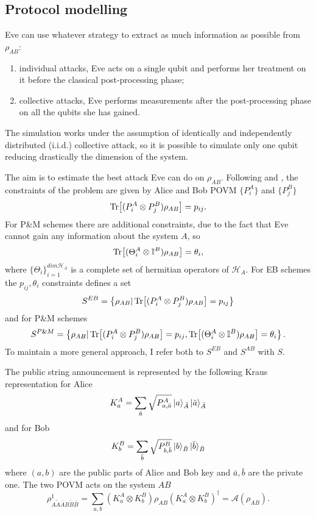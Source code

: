 \documentclass{article}
\begin{document}
    \subsection{Protocol modelling}
    Eve can use whatever strategy to extract as much information as possible from \(\rho_{AB}\):
    \begin{enumerate}
        \item individual attacks, Eve acts on a single qubit and performs her treatment on it before the classical post-processing phase;
        \item collective attacks, Eve performs measurements after the post-processing phase on all the qubits she has gained.
    \end{enumerate}
    The simulation works under the assumption of identically and independently distributed (i.i.d.) collective attack, so it is possible to simulate only one qubit reducing drastically the dimension of the system.

    The aim is to estimate the best attack Eve can do on \(\rho_{AB}\).
    Following \cite{George_2021} and \cite{Winick2018reliablenumerical}, the constraints of the problem are given by Alice and Bob POVM \(\{P^A_i\}\) and \(\{P^B_j\}\)
    \begin{equation}
        \Tr[(P^A_i\otimes P^B_j) \rho_{AB} ] = p_{ij}.
        \label{eqn:constraints1}
    \end{equation}
    For P\&M schemes there are additional constraints, due to the fact that Eve cannot gain any information about the system \(A\), so
    \begin{equation}
        \Tr[(\Theta^A_i\otimes\mathbb{I}^B)\rho_{AB}] = \theta_i,
        \label{eqn:constraints2}
    \end{equation}
    where \(\{\Theta_{i}\}_{i=1}^{dim \mathcal{H}_A}\) is a complete set of hermitian operators of \( \mathcal{H}_A \).
    For EB schemes the \(p_{ij}, \theta_i\) constraints defines a set
    \[S^{EB}=\left\{ \rho_{AB} | \Tr[(P^A_i\otimes P^B_j) \rho_{AB} ] = p_{ij}\right\}\]
    and for P\&M schemes
    \[S^{P\&M}=\left\{\rho_{AB} | \Tr[(P^A_i\otimes P^B_j) \rho_{AB}] = p_{ij},  \Tr[(\Theta^A_i\otimes\mathbb{I}^B)\rho_{AB}] = \theta_i\right\}.\]
    To maintain a more general approach, I refer both to \(S^{EB}\) and \(S^{AB}\) with \(S\).

    The public string announcement is represented by the following Kraus representation for Alice
    \[K^A_{a} = \sum_{\bar{a}} \sqrt{P^A_{a,\bar{a}}} \ket{a}_{\tilde{A}}\ket{\bar{a}}_{\bar{A}} \]
    and for Bob
    \[K^B_{b} = \sum_{\bar{b}} \sqrt{P^B_{b,\bar{b}}} \ket{b}_{\tilde{B}}\ket{\bar{b}}_{\bar{B}} \]
    where \((a,b)\) are the public parts of Alice and Bob key and \(\bar{a},\bar{b}\) are the private one.
    The two POVM acts on the system \(AB\)
    \begin{equation}
        \rho^1_{A\tilde{A}\bar{A}B\tilde{B}\bar{B}}=\sum_{a,b}(K^A_{a}\otimes K^B_b)\rho_{AB}(K^A_{a}\otimes K^B_b)^{\dagger}=\mathcal{A}(\rho_{AB}).
        \label{eqn:kraus}
    \end{equation}
\end{document}
